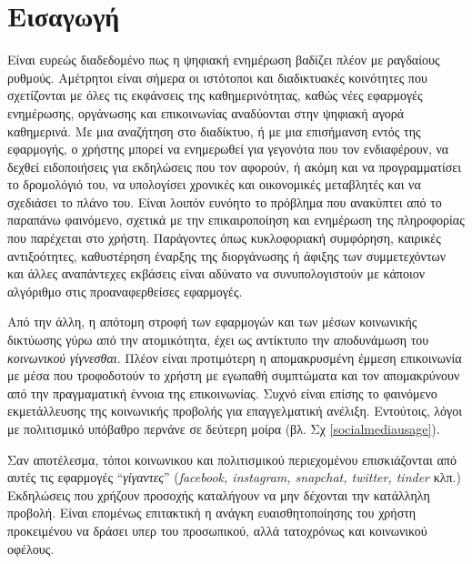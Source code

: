 \chapter{Εισαγωγή}
\label{chap1}

Είναι ευρεώς διαδεδομένο πως η ψηφιακή ενημέρωση βαδίζει πλέον με ραγδαίους ρυθμούς. Αμέτρητοι είναι σήμερα οι ιστότοποι και διαδικτυακές κοινότητες που σχετίζονται με όλες τις εκφάνσεις της καθημερινότητας, καθώς νέες εφαρμογές ενημέρωσης, οργάνωσης και επικοινωνίας αναδύονται στην ψηφιακή αγορά καθημερινά. Με μια αναζήτηση στο διαδίκτυο, ή με μια επισήμανση εντός της εφαρμογής, ο χρήστης μπορεί να ενημερωθεί για γεγονότα που τον ενδιαφέρουν, να δεχθεί ειδοποιήσεις για εκδηλώσεις που τον αφορούν, ή ακόμη και να προγραμματίσει το δρομολόγιό του, να υπολογίσει χρονικές και οικονομικές μεταβλητές και να σχεδιάσει το πλάνο του. Είναι λοιπόν ευνόητο το πρόβλημα που ανακύπτει από το παραπάνω φαινόμενο, σχετικά με την επικαιροποίηση και ενημέρωση της πληροφορίας που παρέχεται στο χρήστη. Παράγοντες όπως κυκλοφοριακή συμφόρηση, καιρικές αντιξοότητες, καθυστέρηση έναρξης της διοργάνωσης ή άφιξης των συμμετεχόντων και άλλες αναπάντεχες εκβάσεις είναι αδύνατο να συνυπολογιστούν με κάποιον αλγόριθμο στις προαναφερθείσες εφαρμογές.

Από την άλλη, η απότομη στροφή των εφαρμογών και των μέσων κοινωνικής δικτύωσης γύρω από την ατομικότητα, έχει ως αντίκτυπο την αποδυνάμωση του \textit{κοινωνικού γίγνεσθαι}. Πλέον είναι προτιμότερη η απομακρυσμένη έμμεση επικοινωνία με μέσα που τροφοδοτούν το χρήστη με εγωπαθή συμπτώματα και τον απομακρύνουν από την πραγμαματική έννοια της επικοινωνίας. Συχνό είναι επίσης το φαινόμενο εκμετάλλευσης της κοινωνικής προβολής για επαγγελματική ανέλιξη. Εντούτοις, λόγοι με πολιτισμικό υπόβαθρο περνάνε σε δεύτερη μοίρα (βλ. Σχ \ref{socialmediausage}). 

Σαν αποτέλεσμα, τόποι κοινωνικου και πολιτισμικού περιεχομένου επισκιάζονται από αυτές τις εφαρμογές ``\textit{γίγαντες}'' (\textit{facebook, instagram, snapchat, twitter, tinder} κλπ.) Εκδηλώσεις που χρήζουν προσοχής καταλήγουν να μην δέχονται την κατάλληλη προβολή. Είναι επομένως επιτακτική η ανάγκη ευαισθητοποίησης του χρήστη προκειμένου να δράσει υπερ του προσωπικού, αλλά τατοχρόνως και κοινωνικού οφέλους.  

